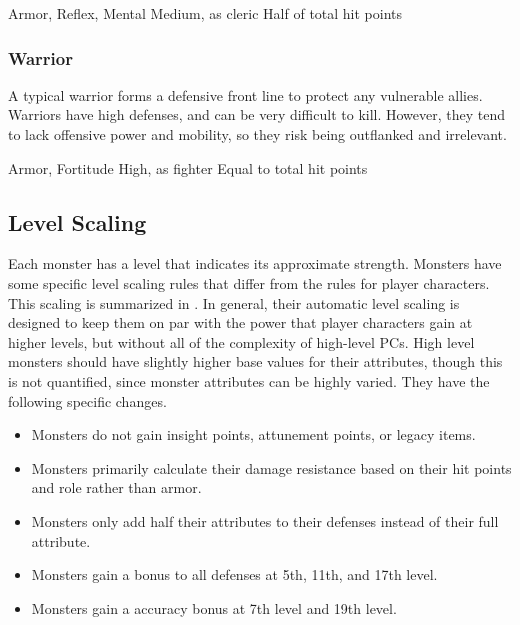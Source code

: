         Armor,  Reflex,  Mental
       Medium, as cleric
       Half of total hit points

    \subsubsection{Warrior}
      A typical warrior forms a defensive front line to protect any vulnerable allies.
      Warriors have high defenses, and can be very difficult to kill.
      However, they tend to lack offensive power and mobility, so they risk being outflanked and irrelevant.

        Armor,  Fortitude
       High, as fighter
       Equal to total hit points

  \subsection{Level Scaling}
    Each monster has a level that indicates its approximate strength.
    Monsters have some specific level scaling rules that differ from the rules for player characters.
    This scaling is summarized in .
    In general, their automatic level scaling is designed to keep them on par with the power that player characters gain at higher levels, but without all of the complexity of high-level PCs.
    High level monsters should have slightly higher base values for their attributes, though this is not quantified, since monster attributes can be highly varied.
    They have the following specific changes.
    \begin{itemize}
      \item Monsters do not gain insight points, attunement points, or legacy items.
      \item Monsters primarily calculate their damage resistance based on their hit points and role rather than armor.
      \item Monsters only add half their attributes to their defenses instead of their full attribute.
      \item Monsters gain a  bonus to all defenses at 5th, 11th, and 17th level.
      \item Monsters gain a  accuracy bonus at 7th level and 19th level.
    \end{itemize}


